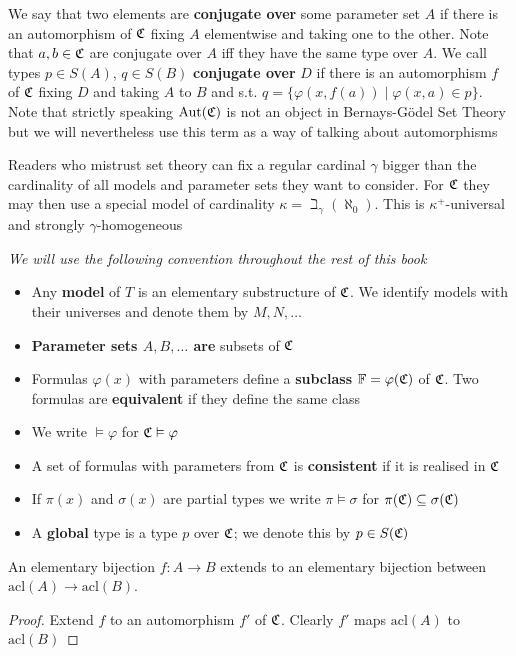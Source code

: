 \documentclass[11pt]{article}
\def \acl {\text{acl}}
\begin{document}
We say that two elements are \textbf{conjugate over} some parameter set \(A\) if there is an automorphism
of \(\mathfrak{C}\) fixing \(A\) elementwise and taking one to the other. Note that \(a,b\in\mathfrak{C}\) are conjugate
over \(A\) iff they have the same type over \(A\). We call types \(p\in S(A)\), \(q\in S(B)\)
\textbf{conjugate over} \(D\) if there is an automorphism \(f\) of \(\mathfrak{C}\) fixing \(D\) and taking \(A\)
to \(B\) and s.t. \(q=\{\varphi(x,f(a))\mid \varphi(x,a)\in p\}\). Note that strictly speaking \(\operatorname{\text{Aut}}(\mathfrak{C})\) is not
an object in Bernays-Gödel Set Theory but we will nevertheless use this term as a way of talking
about automorphisms

Readers who mistrust set theory can fix a regular cardinal \(\gamma\) bigger than the cardinality of all
models and parameter sets they want to consider. For \(\mathfrak{C}\) they may then use a special model of
cardinality \(\kappa=\beth_\gamma(\aleph_0)\). This is \(\kappa^+\)-universal and strongly \(\gamma\)-homogeneous

\emph{We will use the following convention throughout the rest of this book}
\begin{itemize}
\item Any \textbf{model} of \(T\) is an elementary substructure of \(\mathfrak{C}\). We identify models with their
universes and denote them by \(M,N,\dots\)
\item \textbf{Parameter sets \(A,B,\dots\) are} subsets of \(\mathfrak{C}\)
\item Formulas \(\varphi(x)\) with parameters define a \textbf{subclass} \(\mathbb{F}=\varphi(\mathfrak{C})\) of \(\mathfrak{C}\). Two formulas are
\textbf{equivalent} if they define the same class
\item We write \(\vDash\varphi\) for \(\mathfrak{C}\vDash\varphi\)
\item A set of formulas with parameters from \(\mathfrak{C}\) is \textbf{consistent} if it is realised in \(\mathfrak{C}\)
\item If \(\pi(x)\) and \(\sigma(x)\) are partial types we write \(\pi\vDash\sigma\) for \(\pi(\mathfrak{C})\subseteq\sigma(\mathfrak{C})\)
\item A \textbf{global} type is a type \(p\) over \(\mathfrak{C}\); we denote this by \(p\in S(\mathfrak{C})\)
\end{itemize}


\begin{lemma}[]
An elementary bijection \(f:A\to B\) extends to an elementary bijection between \(\acl(A)\to\acl(B)\).
\end{lemma}

\begin{proof}
Extend \(f\) to an automorphism \(f'\) of \(\mathfrak{C}\). Clearly \(f'\) maps \(\acl(A)\) to \(\acl(B)\)
\end{proof}
\end{document}
